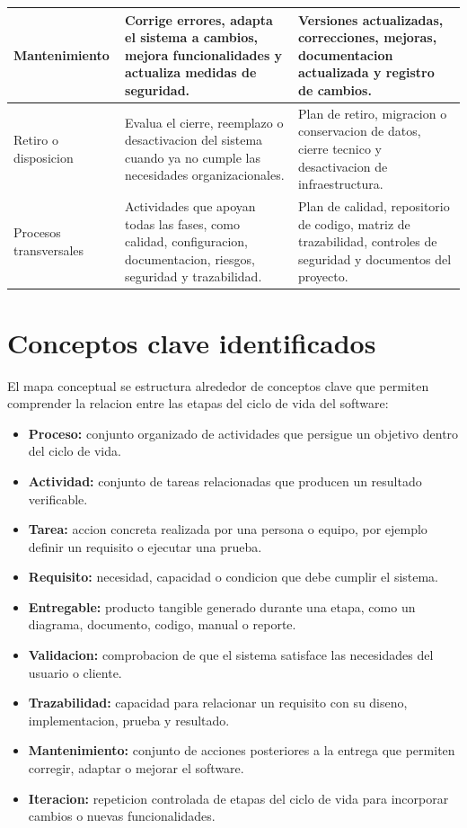 \documentclass[12pt,letterpaper]{article}
\begin{document}
\begin{longtable}{|p{3.5cm}|p{5.5cm}|p{5.6cm}|}
Mantenimiento & Corrige errores, adapta el sistema a cambios, mejora funcionalidades y actualiza medidas de seguridad. & Versiones actualizadas, correcciones, mejoras, documentacion actualizada y registro de cambios. \\
\hline

Retiro o disposicion & Evalua el cierre, reemplazo o desactivacion del sistema cuando ya no cumple las necesidades organizacionales. & Plan de retiro, migracion o conservacion de datos, cierre tecnico y desactivacion de infraestructura. \\
\hline

Procesos transversales & Actividades que apoyan todas las fases, como calidad, configuracion, documentacion, riesgos, seguridad y trazabilidad. & Plan de calidad, repositorio de codigo, matriz de trazabilidad, controles de seguridad y documentos del proyecto. \\
\hline
\end{longtable}

\section{Conceptos clave identificados}

El mapa conceptual se estructura alrededor de conceptos clave que permiten comprender la relacion entre las etapas del ciclo de vida del software:

\begin{itemize}[leftmargin=1.2cm]
    \item \textbf{Proceso:} conjunto organizado de actividades que persigue un objetivo dentro del ciclo de vida.
    \item \textbf{Actividad:} conjunto de tareas relacionadas que producen un resultado verificable.
    \item \textbf{Tarea:} accion concreta realizada por una persona o equipo, por ejemplo definir un requisito o ejecutar una prueba.
    \item \textbf{Requisito:} necesidad, capacidad o condicion que debe cumplir el sistema.
    \item \textbf{Entregable:} producto tangible generado durante una etapa, como un diagrama, documento, codigo, manual o reporte.
    \item \textbf{Validacion:} comprobacion de que el sistema satisface las necesidades del usuario o cliente.
    \item \textbf{Trazabilidad:} capacidad para relacionar un requisito con su diseno, implementacion, prueba y resultado.
    \item \textbf{Mantenimiento:} conjunto de acciones posteriores a la entrega que permiten corregir, adaptar o mejorar el software.
    \item \textbf{Iteracion:} repeticion controlada de etapas del ciclo de vida para incorporar cambios o nuevas funcionalidades.
\end{itemize}
\end{document}
